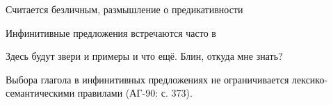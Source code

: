 

Считается безличным, размышление о предикативности 

Инфинитивные предложения встречаются часто в 

Здесь будут звери и примеры и что ещё. Блин, откуда мне знать?	






Выбора глагола в инфинитивных предложениях не ограничивается лексико-семантическими правилами (АГ-90: с. 373).
%
%
%

